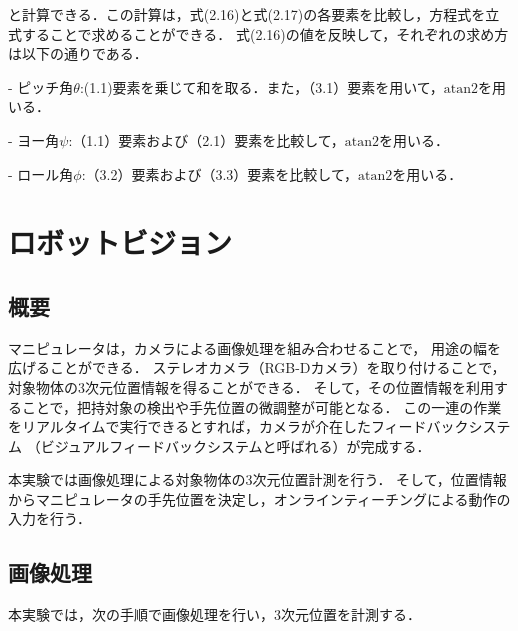 と計算できる．この計算は，式(2.16)と式(2.17)の各要素を比較し，方程式を立式することで求めることができる．
式(2.16)の値を反映して，それぞれの求め方は以下の通りである．


- ピッチ角$\theta$:(1.1)要素を乗じて和を取る．また，（3.1）要素を用いて，$\text{atan2}$を用いる．


- ヨー角$\psi$:（1.1）要素および（2.1）要素を比較して，$\text{atan2}$を用いる．


- ロール角$\phi$:（3.2）要素および（3.3）要素を比較して，$\text{atan2}$を用いる．


\section{ロボットビジョン}

\subsection{概要}
マニピュレータは，カメラによる画像処理を組み合わせることで，
用途の幅を広げることができる．
ステレオカメラ（RGB-Dカメラ）を取り付けることで，対象物体の3次元位置情報を得ることができる．
そして，その位置情報を利用することで，把持対象の検出や手先位置の微調整が可能となる．
この一連の作業をリアルタイムで実行できるとすれば，カメラが介在したフィードバックシステム
（ビジュアルフィードバックシステムと呼ばれる）が完成する．

本実験では画像処理による対象物体の3次元位置計測を行う．
そして，位置情報からマニピュレータの手先位置を決定し，オンラインティーチングによる動作の入力を行う．

\subsection{画像処理}
本実験では，次の手順で画像処理を行い，3次元位置を計測する．

